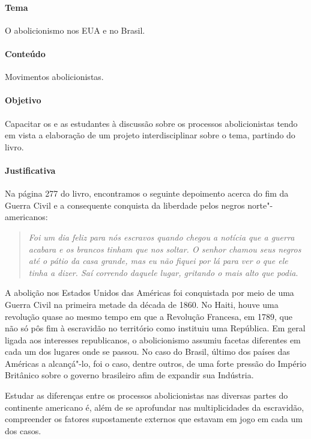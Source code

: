 \documentclass[11pt]{extarticle}
\begin{document}
\paragraph{Tema} O abolicionismo nos EUA e no Brasil.

\paragraph{Conteúdo} Movimentos abolicionistas.

\paragraph{Objetivo} Capacitar os e as estudantes à discussão sobre os processos abolicionistas
tendo em vista a elaboração de um projeto interdisciplinar sobre o tema, partindo do livro. 

\paragraph{Justificativa} Na página 277 do livro, encontramos o seguinte depoimento
acerca do fim da Guerra Civil e a consequente conquista da liberdade pelos negros norte"-americanos:

\begin{quote}
\emph{Foi um dia feliz para nós escravos quando chegou a notícia que a guerra acabara 
e os brancos tinham que nos soltar. O senhor chamou seus negros até o pátio da casa
grande, mas eu não fiquei por lá para ver o que ele tinha
a dizer. Saí correndo daquele lugar, gritando o mais alto que podia}.
\end{quote}

A abolição nos Estados Unidos das Américas foi conquistada por meio de uma Guerra Civil na
primeira metade da década de 1860. No Haiti, houve uma revolução quase ao mesmo tempo
em que a Revolução Francesa, em 1789, que não só pôs fim à escravidão no território
como instituiu uma República. Em geral ligada aos interesses republicanos, 
o abolicionismo assumiu facetas diferentes em cada um dos lugares onde se 
passou. No caso do Brasil, último dos países das Américas a alcançá"-lo,
foi o caso, dentre outros, de uma forte pressão do Império Britânico sobre 
o governo brasileiro afim de expandir sua Indústria.

Estudar as diferenças entre os processos abolicionistas nas diversas
partes do continente americano é, além de se aprofundar nas multiplicidades
da escravidão, compreender os fatores supostamente externos que estavam em jogo 
em cada um dos casos.
\end{document}
